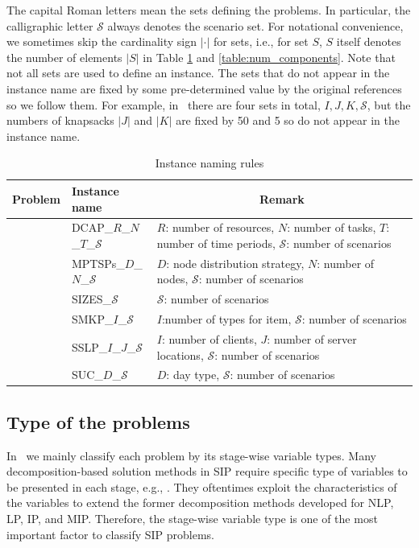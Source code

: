 The capital Roman letters mean the sets defining the problems. In particular, the calligraphic letter $\mathcal{S}$ always denotes the scenario set. For notational convenience, we sometimes skip the cardinality sign $|\cdot|$ for sets, i.e., for set $S$, $S$ itself denotes the number of elements $|S|$ in Table \ref{table:naming_rule} and \ref{table:num_components}. Note that not all sets are used to define an instance. The sets that do not appear in the instance name are fixed by some pre-determined value by the original references so we follow them. For example, in \smkp\ there are four sets in total, $I,J,K,\mathcal{S}$, but the numbers of knapsacks $|J|$ and $|K|$ are fixed by 50 and 5 so do not appear in the instance name.
\begin{table}[H]
	\centering
	\caption{Instance naming rules}
	\label{table:naming_rule}
	\resizebox{\textwidth}{!}
	{%
		\begin{tabular}{@{}llp{3in}}
			\toprule
			Problem & Instance name                 & \multicolumn{1}{c}{Remark}                                                                    					      \\ \midrule
			\dcap\    & DCAP\_$R$\_$N$\_$T$\_$\mathcal{S}$    &   $R$: number of resources, $N$: number of tasks, $T$: number of time periods, $\mathcal{S}$: number of scenarios        \\
			\mptsps\  & MPTSPs\_$D$\_$N$\_$\mathcal{S}$ &$D$: node distribution strategy, $N$: number of nodes, $\mathcal{S}$: number of scenarios\\
			\sizes\   & SIZES\_$\mathcal{S}$                            & $\mathcal{S}$: number of scenarios   															\\
			\smkp\    &   SMKP\_$I$\_$\mathcal{S}$    &   $I$:number of types for item, $\mathcal{S}$: number of scenarios  													 \\
			\sslp\    &  SSLP\_$I$\_$J$\_$\mathcal{S}$      &    $I$: number of clients, $J$: number of server locations, $\mathcal{S}$: number of scenarios                 				   \\
			\suc\    & 	SUC\_$D$\_$\mathcal{S}$    &  $D$: day type, $\mathcal{S}$: number of scenarios                                                 						 \\ \bottomrule
		\end{tabular}%
	}
\end{table}

\subsection{Type of the problems}
In \siplibtwo\, we mainly classify each problem by its stage-wise variable types. Many decomposition-based solution methods in SIP require specific type of variables to be presented in each stage, e.g., \cite{journal:LL1993,journal:SSV1998,journal:CT1998,journal:CS1999,journal:SF2002}. They oftentimes exploit the characteristics of the variables to extend the former decomposition methods developed for NLP, LP, IP, and MIP. Therefore, the stage-wise variable type is one of the most important factor to classify SIP problems.

